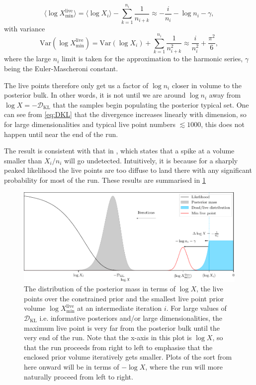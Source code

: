 \documentclass[usenatbib]{mnras}
\newcommand{\nlive}{n_i}
\newcommand{\DKL}{\mathcal{D}_\mathrm{KL}}
\begin{document}
\begin{equation}\label{eq:Xmin}
    \langle\log X_\mathrm{min}^{\mathrm{live}}\rangle = \langle\log X_i\rangle - \sum_{k=1}^{\nlive} \frac{1}{n_{i+k}} \approx -\frac{i}{\nlive} - \log \nlive - \gamma,
\end{equation}
with variance
\begin{equation}
    \mathrm{Var}(\log X_\mathrm{min}^{\mathrm{live}}) = \mathrm{Var}(\log X_i) + \sum_{k=1}^{\nlive} \frac{1}{n_{i+k}^2} \approx \frac{i}{\nlive^2} + \frac{\pi^2}{6}, 
\end{equation}
where the large $\nlive$ limit is taken for the approximation to the harmonic series, $\gamma$ being the Euler-Mascheroni constant.
\par
The live points therefore only get us a factor of $\log \nlive$ closer in volume to the posterior bulk. In other words, it is not until we are around $\log \nlive$ away from $\log X = -\DKL$ that the samples begin populating the posterior typical set. One can see from \cref{eq:DKL} that the divergence increases linearly with dimension, so for large dimensionalities and typical live point numbers $\lesssim 1000$, this does not happen until near the end of the run.
\par
The result is consistent with that in \citet{statmech}, which states that a spike at a volume smaller than $X_i/n_i$ will go undetected. Intuitively, it is because for a sharply peaked likelihood the live points are too diffuse to land there with any significant probability for most of the run. These results are summarised in \cref{fig:logX_distribution}
\begin{figure}
\begin{center}
    \includegraphics{figures/logX_distribution.pdf}
\end{center}
\caption{The distribution of the posterior mass in terms of $\log X$, the live points over the constrained prior and the smallest live point prior volume $\log X_\mathrm{min}^{\mathrm{live}}$ at an intermediate iteration $i$. For large values of $\DKL$ i.e. informative posteriors and/or large dimensionalities, the maximum live point is very far from the posterior bulk until the very end of the run. Note that the x-axis in this plot is $\log X$, so that the run proceeds from right to left to emphasise that the enclosed prior volume iteratively gets smaller. Plots of the sort from here onward will be in terms of $-\log X$, where the run will more naturally proceed from left to right. }
\label{fig:logX_distribution}
\end{figure}
\end{document}
